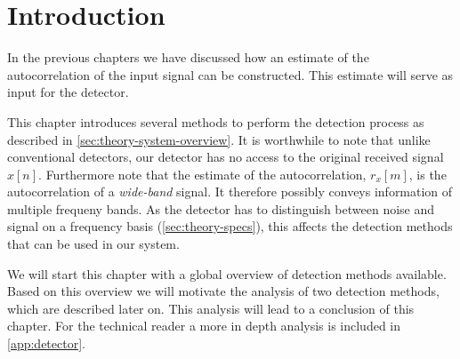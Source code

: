 \documentclass[a4paper, openany, oneside]{memoir}
\begin{document}
\section{Introduction}
In the previous chapters we have discussed how an estimate of the autocorrelation of the input signal can be constructed. This estimate will serve
as input for the detector.

This chapter introduces several methods to perform the detection process as described in \cref{sec:theory-system-overview}. It is worthwhile to note that unlike conventional detectors, our detector has no access to the original received signal $x[n]$. Furthermore note that the estimate of the autocorrelation, $r_x[m]$, is the autocorrelation of a \emph{wide-band} signal. It therefore possibly conveys information of multiple frequeny bands. As the detector has to distinguish between noise and signal on a frequency basis (\cref{sec:theory-specs}), this affects the detection methods that can be used in our system.  

We will start this chapter with a global overview of detection methods available. Based on this overview we will motivate the analysis of two detection methods, which are described later on. This analysis will lead to a conclusion of this chapter. For the technical reader a more in depth analysis is included in \cref{app:detector}.
\end{document}
